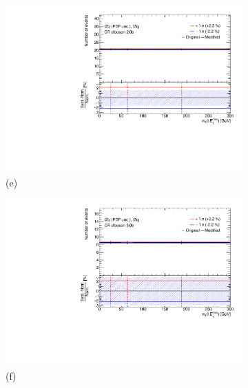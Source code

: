 \begin{figure}[!h]
\begin{subfigure}[b]{0.33\linewidth}
    \includegraphics[width=\textwidth]{ubonn-thesis/Chapters/Chapters_07/Figure/Data/Systematic/tZq_pdf/CR_2j0b_tZq_tZq_XS_PDFunc.pdf} 
    \caption*{(e)}
  \end{subfigure}%
   \begin{subfigure}[b]{0.33\linewidth}
  \centering
    \includegraphics[width=\textwidth]{ubonn-thesis/Chapters/Chapters_07/Figure/Data/Systematic/tZq_pdf/CR_3j0b_tZq_tZq_XS_PDFunc.pdf} 
    \caption*{(f)}
  \end{subfigure}%
  \newline
  \centering
  \begin{subfigure}[b]{0.33\linewidth}

\end{subfigure}
\end{figure}
